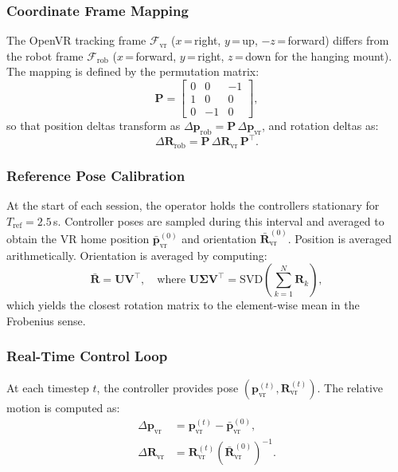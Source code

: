 \documentclass[conference]{IEEEtran}
\begin{document}
\subsubsection{Coordinate Frame Mapping}

The OpenVR tracking frame $\mathcal{F}_\mathrm{vr}$ ($x$\,=\,right, $y$\,=\,up, $-z$\,=\,forward) differs from the robot frame $\mathcal{F}_\mathrm{rob}$ ($x$\,=\,forward, $y$\,=\,right, $z$\,=\,down for the hanging mount). The mapping is defined by the permutation matrix:
\begin{equation}
\label{eq:P}
\mathbf{P} = \begin{bmatrix} 0 & 0 & -1 \\ 1 & 0 & 0 \\ 0 & -1 & 0 \end{bmatrix},
\end{equation}
so that position deltas transform as $\Delta\mathbf{p}_\mathrm{rob} = \mathbf{P}\,\Delta\mathbf{p}_\mathrm{vr}$, and rotation deltas as:
\begin{equation}
\label{eq:rot_remap}
\Delta\mathbf{R}_\mathrm{rob} = \mathbf{P}\,\Delta\mathbf{R}_\mathrm{vr}\,\mathbf{P}^\top.
\end{equation}

\subsubsection{Reference Pose Calibration}
At the start of each session, the operator holds the controllers stationary for $T_\mathrm{ref} = 2.5$\,s. Controller poses are sampled during this interval and averaged to obtain the VR home position $\bar{\mathbf{p}}_\mathrm{vr}^{(0)}$ and orientation $\bar{\mathbf{R}}_\mathrm{vr}^{(0)}$. Position is averaged arithmetically. Orientation is averaged by computing:
\begin{equation}
\label{eq:rot_avg}
\bar{\mathbf{R}} = \mathbf{U}\mathbf{V}^\top, \quad \text{where } \mathbf{U}\boldsymbol{\Sigma}\mathbf{V}^\top = \mathrm{SVD}\!\left(\sum_{k=1}^{N}\mathbf{R}_k\right),
\end{equation}
which yields the closest rotation matrix to the element-wise mean in the Frobenius sense.

\subsubsection{Real-Time Control Loop}
At each timestep $t$, the controller provides pose $(\mathbf{p}_\mathrm{vr}^{(t)}, \mathbf{R}_\mathrm{vr}^{(t)})$. The relative motion is computed as:
\begin{align}
\Delta\mathbf{p}_\mathrm{vr} &= \mathbf{p}_\mathrm{vr}^{(t)} - \bar{\mathbf{p}}_\mathrm{vr}^{(0)}, \label{eq:dp} \\
\Delta\mathbf{R}_\mathrm{vr} &= \mathbf{R}_\mathrm{vr}^{(t)} \left(\bar{\mathbf{R}}_\mathrm{vr}^{(0)}\right)^{-1}. \label{eq:dR}
\end{align}
\end{document}

